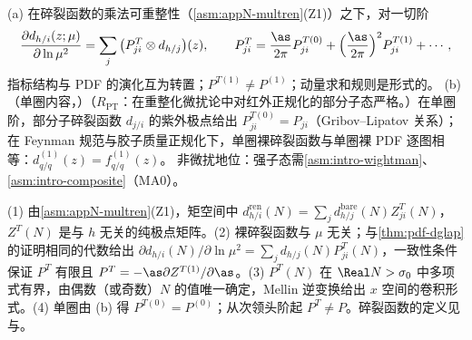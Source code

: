 \begin{proposition}\label{prop:pdf-timelike-dglap}
(a) 在碎裂函数的乘法可重整性（\cref{asm:appN-multren}(Z1)）之下，对一切阶
\begin{equation}\label{eq:pdf-tdglap}
\frac{\partial d_{h/i}(z;\mu)}{\partial\ln\mu^2}=\sum_j\big(P^T_{ji}\otimes d_{h/j}\big)(z),\qquad P^T_{ji}=\frac{\as}{2\pi}P^{T(0)}_{ji}+\Big(\frac{\as}{2\pi}\Big)^2P^{T(1)}_{ji}+\cdots,
\end{equation}
指标结构与 PDF 的演化互为转置；$P^{T(1)}\ne P^{(1)}$\cite{CurciFurmanskiPetronzio1980}；动量求和规则是形式的。
(b)（单圈内容，\tagR）（$R_{\mathrm{PT}}$：在重整化微扰论中对红外正规化的部分子态严格。）在单圈阶，部分子碎裂函数 $d_{j/i}$ 的紫外极点给出 $P^{T(0)}_{ji}=P_{ji}$（Gribov--Lipatov 关系\cite{GribovLipatov1972b}）；在 Feynman 规范与胶子质量正规化下，单圈裸碎裂函数与单圈裸 PDF 逐图相等：$d^{(1)}_{q/q}(z)=f^{(1)}_{q/q}(z)$。
非微扰地位：强子态需\cref{asm:intro-wightman}、\cref{asm:intro-composite}（MA0）。
\end{proposition}

\begin{proofsketch}[(a) 的证明概要]
(1) 由\cref{asm:appN-multren}(Z1)，矩空间中 $d^{\mathrm{ren}}_{h/i}(N)=\sum_jd^{\mathrm{bare}}_{h/j}(N)Z^T_{ji}(N)$，$Z^T(N)$ 是与 $h$ 无关的纯极点矩阵。(2) 裸碎裂函数与 $\mu$ 无关；与\cref{thm:pdf-dglap}的证明相同的代数给出 $\partial d_{h/i}(N)/\partial\ln\mu^2=\sum_jd_{h/j}(N)P^T_{ji}(N)$，一致性条件保证 $P^T$ 有限且 $P^T=-\as\partial Z^{T(1)}/\partial\as$。(3) $P^T(N)$ 在 $\Real N>\sigma_0$ 中多项式有界，由偶数（或奇数）$N$ 的值唯一确定，Mellin 逆变换给出 $x$ 空间的卷积形式。(4) 单圈由 (b) 得 $P^{T(0)}=P^{(0)}$；从次领头阶起 $P^T\ne P$。碎裂函数的定义见\cite{CollinsSoper1982a}与\cite[第~12.4~节]{Collins2011}。
\end{proofsketch}

